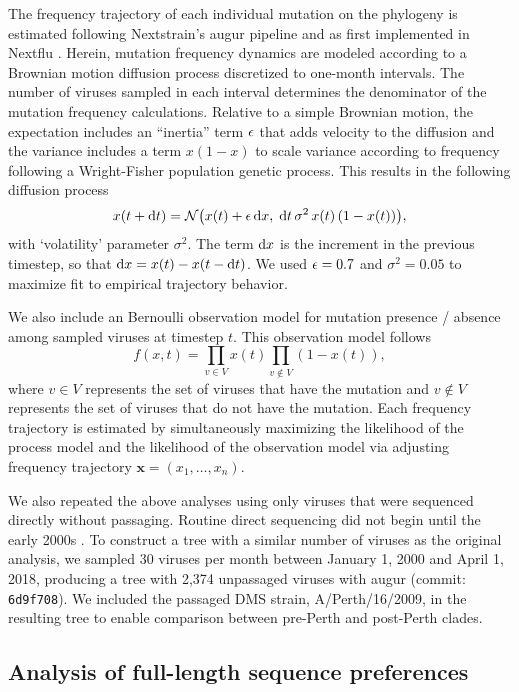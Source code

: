The frequency trajectory of each individual mutation on the phylogeny is estimated following Nextstrain's augur pipeline and as first implemented in Nextflu \citep{Neher:2015jr}.
Herein, mutation frequency dynamics are modeled according to a Brownian motion diffusion process discretized to one-month intervals.
The number of viruses sampled in each interval determines the denominator of the mutation frequency calculations.
Relative to a simple Brownian motion, the expectation includes an ``inertia'' term $\epsilon$ that adds velocity to the diffusion and the variance includes a term $x(1-x)$ to scale variance according to frequency following a Wright-Fisher population genetic process.
This results in the following diffusion process
\begin{equation}
x(t+\mathrm{d}t) = \mathcal{N}\big( x(t) + \epsilon \, \mathrm{d}x , \; \mathrm{d}t \, \sigma^2 \, x(t) \, (1-x(t)) \big),
\end{equation}
with `volatility' parameter $\sigma^2$.
The term $\mathrm{d}x$ is the increment in the previous timestep, so that $\mathrm{d}x = x(t) - x(t-\mathrm{d}t)$.
We used $\epsilon = 0.7$ and $\sigma^2 = 0.05$ to maximize fit to empirical trajectory behavior.

We also include an Bernoulli observation model for mutation presence / absence among sampled viruses at timestep $t$.
This observation model follows
\begin{equation}
f(x,t) = \prod_{v\in V} x(t) \prod_{v\notin V} (1-x(t)),
\end{equation}
where $v\in V$ represents the set of viruses that have the mutation and $v\notin V$ represents the set of viruses that do not have the mutation.
Each frequency trajectory is estimated by simultaneously maximizing the likelihood of the process model and the likelihood of the observation model via adjusting frequency trajectory $\mathbf{x}=(x_1, \ldots, x_n)$.

We also repeated the above analyses using only viruses that were sequenced directly without passaging.
Routine direct sequencing did not begin until the early 2000s \citep{McWhite:2016fe}.
To construct a tree with a similar number of viruses as the original analysis, we sampled 30 viruses per month between January 1, 2000 and April 1, 2018, producing a tree with 2,374 unpassaged viruses with augur (commit: \texttt{6d9f708}).
We included the passaged DMS strain, A/Perth/16/2009, in the resulting tree to enable comparison between pre-Perth and post-Perth clades.

\subsection{Analysis of full-length sequence preferences}

